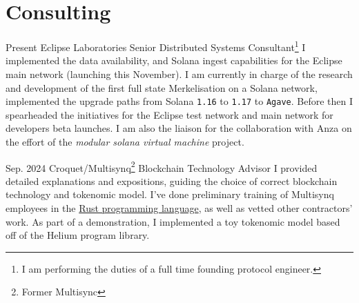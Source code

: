 \documentclass{CurriculumVitae}[10pt, condensed]
\author{Aleksandr Petrosyan}
\date{\today}
\begin{document}
\maketitle

\vfill
\section*{Consulting}
%
    {Present}%
    {Eclipse Laboratories}%
    {Senior Distributed Systems Consultant\footnote{I am performing
        the duties of a full time founding protocol engineer. }}%
    {%
      I implemented the data availability, and Solana ingest
      capabilities for the Eclipse main network (launching this November).
      I am currently in charge of the research and development of the first
      full state Merkelisation on a Solana network, implemented the
      upgrade paths from Solana \texttt{1.16} to \texttt{1.17} to
      \texttt{Agave}.  Before then I spearheaded the initiatives for
      the Eclipse test network and main network for developers beta
      launches.  I am also the liaison for the collaboration with Anza
      on the effort of the \emph{modular solana virtual machine} project.
    }%

%
    {Sep. 2024}%
    {Croquet/Multisynq\footnote{Former Multisync}}%
    {Blockchain Technology Advisor}%
    {%
      I provided detailed explanations and expositions, guiding the
      choice of correct blockchain technology and tokenomic model.  I've
      done preliminary training of Multisynq employees in the
      \href{https://github.com/Greybeard-Entertainment/rust}{Rust
        programming language}, as well as vetted other contractors' work.  As
      part of a demonstration, I implemented a toy tokenomic model based off
      of the Helium program library.
    }%


\vfill
\end{document}

